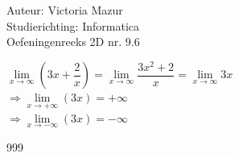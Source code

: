 \documentclass[a4paper]{article}
\begin{document}
  
\noindent \large Auteur: Victoria Mazur \\
\noindent \large Studierichting: Informatica\\
\noindent \large Oefeningenreeks 2D nr. 9.6\\

\medskip

\normalsize

$\lim\limits_{x \rightarrow \infty} \left(3x + \dfrac{2}{x}\right) = \lim\limits_{x \rightarrow \infty} \dfrac{3x^2 + 2}{x} = \lim\limits_{x \rightarrow \infty} 3x$ \\

$\Rightarrow \lim\limits_{x \rightarrow +\infty} (3x) = +\infty$ \\

$\Rightarrow \lim\limits_{x \rightarrow -\infty} (3x) = -\infty$ \\

\begin{thebibliography}{999}
\end{thebibliography}
\end{document}
